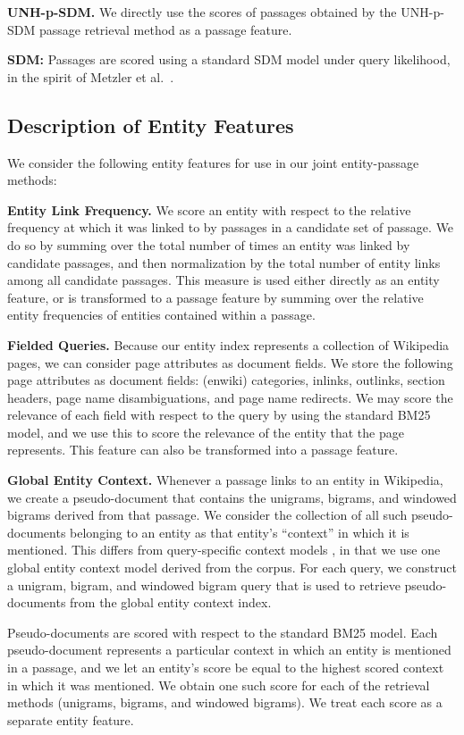 \documentclass{article}
\begin{document}
\textbf{UNH-p-SDM. } We directly use the scores of passages obtained by the UNH-p-SDM passage retrieval method as a passage feature. 

\textbf{SDM:} Passages are scored using a standard SDM model under query likelihood, in the spirit of Metzler et al.\ \cite{metzler2005markov}.


\subsection{Description of Entity Features}\label{sec:jointentity}
We consider the following entity features for use in our joint entity-passage methods:


\textbf{Entity Link Frequency. } We score an entity with respect to the relative frequency at which it was linked to by passages in a candidate set of passage. We do so by summing over the total number of times an entity was linked by candidate passages, and then normalization by the total number of entity links among all candidate passages. This measure is used either directly as an entity feature, or is transformed to a passage feature by summing over the relative entity frequencies of entities contained within a passage. 


\textbf{Fielded Queries.} Because our entity index represents a collection of Wikipedia pages, we can consider page attributes as document fields. We store the following page attributes as document fields: (enwiki) categories, inlinks, outlinks, section headers, page name disambiguations, and page name redirects. We may score the relevance of each field with respect to the query by using the standard BM25 model, and we use this to score the relevance of the entity that the page represents. This feature can also be transformed into a passage feature.


\textbf{Global Entity Context.} Whenever a passage links to an entity in Wikipedia, we create a pseudo-document that contains the unigrams, bigrams, and windowed bigrams derived from that passage.  We consider the collection of all such pseudo-documents belonging to an entity as that entity's ``context'' in which it is mentioned. This differs from query-specific context models  \cite{dalton2014entity}, in that we use one global entity context model derived from the corpus. For each query, we construct a unigram, bigram, and windowed bigram query that is used to retrieve pseudo-documents from the global entity context index. 

Pseudo-documents are scored with respect to the standard BM25 model.
Each pseudo-document represents a particular context in which an entity is mentioned in a passage, and we let an entity's score be equal to the highest scored context in which it was mentioned. We obtain one such score for each of the retrieval methods (unigrams, bigrams, and windowed bigrams). We treat each score as a separate entity feature.
\end{document}
